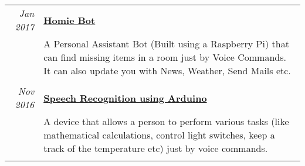 \documentclass[a4paper,10pt]{article}
\begin{document}
\begin{tabular}{r|p{14.5cm}}
 \emph{Jan 2017} & \href{https://homiebot.yashitm.tech}{\textbf{Homie Bot}} \\&\normalsize{A Personal Assistant Bot (Built using a Raspberry Pi) that can find missing items in a room just by Voice Commands. It can also update you with News, Weather, Send Mails etc.}\\\multicolumn{2}{c}{} \\
 \emph{Nov 2016} & \href{https://github.com/YashitM/Arduino-Speech-Recog}{\textbf{Speech Recognition using Arduino}} \\&\normalsize{A device that allows a person to perform various tasks (like mathematical calculations, control light switches, keep a track of the temperature etc) just by voice commands.}\\\multicolumn{2}{c}{} \\
\end{tabular}

\end{document}
